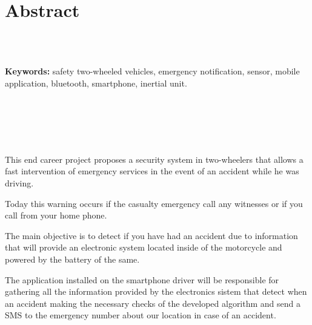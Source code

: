 	\chapter*{Abstract} %
	
	
	\
	\\
	\
	
	\textbf{Keywords:} safety two-wheeled vehicles, emergency notification, sensor, mobile application, bluetooth, smartphone, inertial unit.
	
	\
	\\
	\\
	\\
	\
	
	
	
	This end career project proposes a security system in two-wheelers that allows a fast intervention of emergency services in the event of an accident while he was driving.
	
	Today this warning occurs if the casualty emergency call any witnesses or if you call from your home phone.
	
	The main objective is to detect if you have had an accident due to information that will provide an electronic system located inside of the motorcycle and powered by the battery of the same.
	
	The application installed on the smartphone driver will be responsible for gathering all the information provided by the electronics sistem that detect when an accident making the necessary checks of the developed algorithm and send a SMS to the emergency number about our location in case of an accident.
	
	
	
	
	
	\newpage
	$\ $